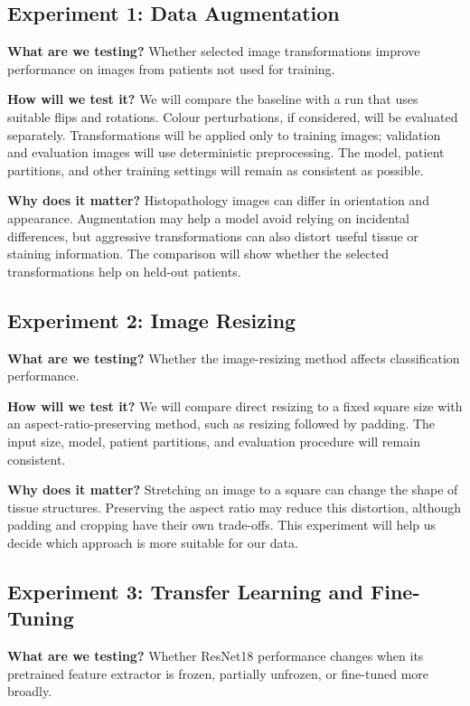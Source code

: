 \documentclass[11pt,a4paper]{article}
\begin{document}
\subsection{Experiment 1: Data Augmentation}

\textbf{What are we testing?} Whether selected image transformations improve performance on images from patients not used for training.

\textbf{How will we test it?} We will compare the baseline with a run that uses suitable flips and rotations. Colour perturbations, if considered, will be evaluated separately. Transformations will be applied only to training images; validation and evaluation images will use deterministic preprocessing. The model, patient partitions, and other training settings will remain as consistent as possible.

\textbf{Why does it matter?} Histopathology images can differ in orientation and appearance. Augmentation may help a model avoid relying on incidental differences, but aggressive transformations can also distort useful tissue or staining information. The comparison will show whether the selected transformations help on held-out patients.

\subsection{Experiment 2: Image Resizing}

\textbf{What are we testing?} Whether the image-resizing method affects classification performance.

\textbf{How will we test it?} We will compare direct resizing to a fixed square size with an aspect-ratio-preserving method, such as resizing followed by padding. The input size, model, patient partitions, and evaluation procedure will remain consistent.

\textbf{Why does it matter?} Stretching an image to a square can change the shape of tissue structures. Preserving the aspect ratio may reduce this distortion, although padding and cropping have their own trade-offs. This experiment will help us decide which approach is more suitable for our data.

\subsection{Experiment 3: Transfer Learning and Fine-Tuning}

\textbf{What are we testing?} Whether ResNet18 performance changes when its pretrained feature extractor is frozen, partially unfrozen, or fine-tuned more broadly.
\end{document}
